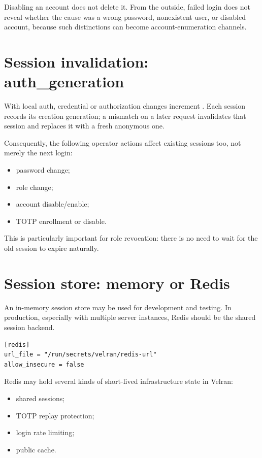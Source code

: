 Disabling an account does not delete it. From the outside, failed login does not reveal whether the cause was a wrong password, nonexistent user, or disabled account, because such distinctions can become account-enumeration channels.

\section{Session invalidation: auth\_generation}

With local auth, credential or authorization changes increment . Each session records its creation generation; a mismatch on a later request invalidates that session and replaces it with a fresh anonymous one.

Consequently, the following operator actions affect existing sessions too, not merely the next login:

\begin{itemize}
  \item password change;
  \item role change;
  \item account disable/enable;
  \item TOTP enrollment or disable.
\end{itemize}

This is particularly important for role revocation: there is no need to wait for the old session to expire naturally.

\section{Session store: memory or Redis}

An in-memory session store may be used for development and testing. In production, especially with multiple server instances, Redis should be the shared session backend.

\begin{lstlisting}
[redis]
url_file = "/run/secrets/velran/redis-url"
allow_insecure = false
\end{lstlisting}

Redis may hold several kinds of short-lived infrastructure state in Velran:

\begin{itemize}
  \item shared sessions;
  \item TOTP replay protection;
  \item login rate limiting;
  \item public cache.
\end{itemize}


